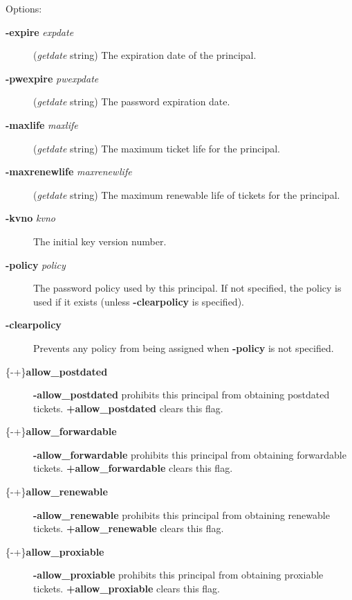 \documentclass[letterpaper,10pt,english]{sphinxmanual}
\begin{document}
Options:
\begin{description}
\item[{\textbf{-expire} \emph{expdate}}] \leavevmode
(\emph{getdate} string) The expiration date of the principal.

\item[{\textbf{-pwexpire} \emph{pwexpdate}}] \leavevmode
(\emph{getdate} string) The password expiration date.

\item[{\textbf{-maxlife} \emph{maxlife}}] \leavevmode
(\emph{getdate} string) The maximum ticket life for the principal.

\item[{\textbf{-maxrenewlife} \emph{maxrenewlife}}] \leavevmode
(\emph{getdate} string) The maximum renewable life of tickets for
the principal.

\item[{\textbf{-kvno} \emph{kvno}}] \leavevmode
The initial key version number.

\item[{\textbf{-policy} \emph{policy}}] \leavevmode
The password policy used by this principal.  If not specified, the
policy  is used if it exists (unless \textbf{-clearpolicy}
is specified).

\item[{\textbf{-clearpolicy}}] \leavevmode
Prevents any policy from being assigned when \textbf{-policy} is not
specified.

\item[{\{-\textbar{}+\}\textbf{allow\_postdated}}] \leavevmode
\textbf{-allow\_postdated} prohibits this principal from obtaining
postdated tickets.  \textbf{+allow\_postdated} clears this flag.

\item[{\{-\textbar{}+\}\textbf{allow\_forwardable}}] \leavevmode
\textbf{-allow\_forwardable} prohibits this principal from obtaining
forwardable tickets.  \textbf{+allow\_forwardable} clears this flag.

\item[{\{-\textbar{}+\}\textbf{allow\_renewable}}] \leavevmode
\textbf{-allow\_renewable} prohibits this principal from obtaining
renewable tickets.  \textbf{+allow\_renewable} clears this flag.

\item[{\{-\textbar{}+\}\textbf{allow\_proxiable}}] \leavevmode
\textbf{-allow\_proxiable} prohibits this principal from obtaining
proxiable tickets.  \textbf{+allow\_proxiable} clears this flag.


\end{description}
\end{document}
